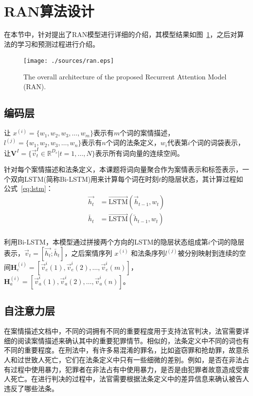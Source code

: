 \section{RAN算法设计}
\label{sec:ran_algori}

在本节中，针对提出了RAN模型进行详细的介绍，其模型结果如图~\ref{fig:ran_model}，之后对算法的学习和预测过程进行介绍。
\begin{figure}[t!]
    \centering
    \texttt{[image: ./sources/ran.eps]}
    \vspace{-10pt}
    \caption{\label{fig:ran_model} The overall architecture of the proposed Recurrent Attention Model (RAN). }
    \vspace{-5pt}
\end{figure}

\subsection{编码层}
让 $x^{(i)} = {\{w_1, w_2, w_3, \dots, w_m\}}$表示有$m$个词的案情描述， $l^{(j)} = {\{w_1, w_2, w_3, \dots, w_n\}}$表示有$n$个词的法条定义，$w_i$代表第$i$个词的词袋表示，让$\textbf{V}^I=\{\vec{v}^I_t\in \mathbb{R}^{D_v}|t=1,\dots,N\}$表示所有词向量的连续空间。

针对每个案情描述和法条定义，本课题将词向量聚合作为案情表示和标签表示，一个双向LSTM(简称Bi-LSTM)用来计算每个词在时刻$t$的隐层状态，其计算过程如公式~\ref{eq:lstm}：
\begin{equation}\label{eq:lstm}
    \begin{aligned}
        \overrightarrow{h_t}&=\overrightarrow{\text{LSTM}}(\overrightarrow{h}_{t-1}, w_t)\\
        \overleftarrow{h_t}&=\overrightarrow{\text{LSTM}}(\overleftarrow{h}_{t-1}, w_t)\\
    \end{aligned}
\end{equation}

利用Bi-LSTM，本模型通过拼接两个方向的LSTM的隐层状态组成第$i$个词的隐层表示，$\vec{v}_t=[\overrightarrow{h_t};\overleftarrow{h_t}]$，之后案情序列 $x^{(i)}$ 和法条序列$l^{(j)}$被分别映射到连续的空间$\textbf{H}_e^{(i)}=[\vec{v}_e^{i}(1), \vec{v}_e^{i}(2), \dots, \vec{v}_e^{i}(m)]$，
$\textbf{H}_a^{(i)}=[\vec{v}_a^{i}(1), \vec{v}_a^{i}(2), \dots, \vec{v}_a^{i}(n)]$。
\subsection{自注意力层}

在案情描述文档中，不同的词拥有不同的重要程度用于支持法官判决，法官需要详细的阅读案情描述来确认其中的重要犯罪情节。相似的，法条定义中不同的词也有不同的重要程度。在刑法中，有许多易混淆的罪名，比如盗窃罪和抢劫罪，故意杀人和过世致人死亡，它们在法条定义中只有一些细微的差别。例如，是否在非法占有过程中使用暴力，犯罪者在非法占有中使用暴力，是否是由犯罪者故意造成受害人死亡。在进行判决的过程中，法官需要根据法条定义中的差异信息来确认被告人违反了哪些法条。

